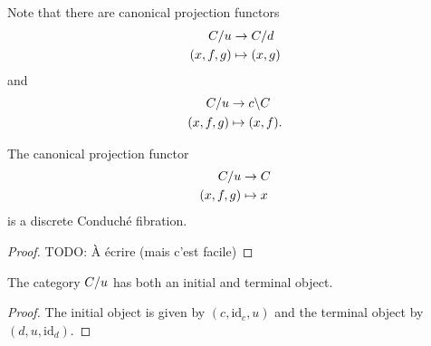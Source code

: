 \documentclass{amsart}
\newcommand{\id}{\mathrm{id}}
\begin{document}
  \begin{remark}
    Note that there are canonical projection functors
    \[
      \begin{aligned}
        \tr{C}{u} &\to \tr{C}{d}\\
        (x,f,g) &\mapsto (x,g)
      \end{aligned}
    \]
    and
    \[
      \begin{aligned}
        \tr{C}{u} &\to \cotr{C}{c}\\
        (x,f,g) &\mapsto (x,f).
      \end{aligned}
    \]
  \end{remark}
  \begin{lemma}\label{lemma:projcond}
    The canonical projection functor
    \[
      \begin{aligned}
        \tr{C}{u} &\to C\\
        (x,f,g) &\mapsto x
      \end{aligned}
    \]
    is a discrete Conduché fibration. 
  \end{lemma}
  \begin{proof}
    TODO: À écrire (mais c'est facile)
  \end{proof}
  \begin{lemma}
    The category $\tr{C}{u}$ has both an initial and terminal object.
  \end{lemma}
  \begin{proof}
    The initial object is given by $(c,\id_{c},u)$ and the terminal
    object by $(d,u,\id_{d})$.
  \end{proof}
\end{document}
